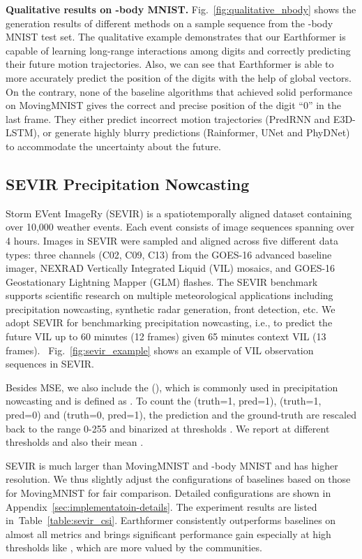 \documentclass{article}
\newcommand{\tabref}[1]{Table~\ref{#1}}
\newcommand{\figref}[1]{Fig.~\ref{#1}}
\renewcommand{\paragraph}[1]{\textbf{#1. }}
\def\nbody{-body MNIST}
\begin{document}
\paragraph{Qualitative results on \nbody{}}
\figref{fig:qualitative_nbody} shows the generation results of different methods on a sample sequence from the \nbody{} test set.
The qualitative example demonstrates that our Earthformer is capable of learning long-range interactions among digits and correctly predicting their future motion trajectories. Also, we can see that Earthformer is able to more accurately predict the position of the digits with the help of global vectors.
On the contrary, none of the baseline algorithms that achieved solid performance on MovingMNIST gives the correct and precise position of the digit ``0'' in the last frame.
They either predict incorrect motion trajectories (PredRNN and E3D-LSTM), or generate highly blurry predictions (Rainformer, UNet and PhyDNet) to accommodate the uncertainty about the future.


\subsection{SEVIR Precipitation Nowcasting}
\label{sec:exp_sevir}
Storm EVent ImageRy (SEVIR) \cite{veillette2020sevir} is a spatiotemporally aligned dataset containing over 10,000 weather events. Each event consists of  image sequences spanning over 4 hours. Images in SEVIR were sampled and aligned across five different data types: three channels (C02, C09, C13) from the GOES-16 advanced baseline imager, NEXRAD Vertically Integrated Liquid (VIL) mosaics, and GOES-16 Geostationary Lightning Mapper (GLM) flashes. 
The SEVIR benchmark supports scientific research on multiple meteorological applications including precipitation nowcasting, synthetic radar generation, front detection, etc. We adopt SEVIR for benchmarking precipitation nowcasting, i.e., to predict the future VIL up to 60 minutes (12 frames) given 65 minutes context VIL (13 frames). ~\figref{fig:sevir_example} shows an example of VIL observation sequences in SEVIR.

Besides MSE, we also include the  (), which is commonly used in precipitation nowcasting and is defined as . To count the  (truth=1, pred=1),  (truth=1, pred=0) and  (truth=0, pred=1), 
the prediction and the ground-truth are rescaled back to the range 0-255 and binarized at thresholds . 
We report  at different thresholds and also their mean .

SEVIR is much larger than MovingMNIST and \nbody{} and has higher resolution. We thus slightly adjust the configurations of baselines based on those for MovingMNIST for fair comparison. Detailed configurations are shown in Appendix~\ref{sec:implementatoin-details}. 
The experiment results are listed in~\tabref{table:sevir_csi}. 
Earthformer consistently outperforms baselines on almost all metrics and brings significant performance gain especially at high thresholds like , which are more valued by the communities.
\end{document}
